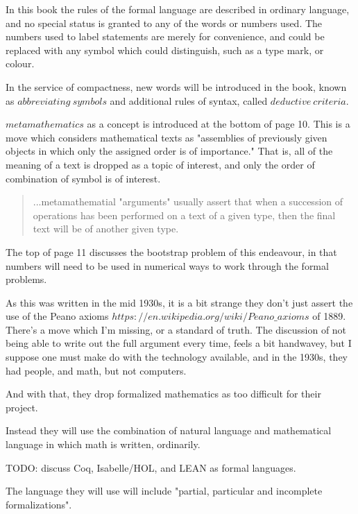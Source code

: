 \documentclass[]{scrartcl}
\begin{document}
In this book the rules of the formal language are described in ordinary language, and no special status is granted to any of the words or numbers used. The numbers used to label statements are merely for convenience, and could be replaced with any symbol which could distinguish, such as a type mark, or colour.

In the service of compactness, new words will be introduced in the book, known as $abbreviating\ symbols$ and additional rules of syntax, called $deductive\ criteria$. 

$metamathematics$ as a concept is introduced at the bottom of page 10. This is a move which considers mathematical texts as "assemblies of previously given objects in which only the assigned order is of importance." That is, all of the meaning of a text is dropped as a topic of interest, and only the order of combination of symbol is of interest. 

\begin{quote}
	...metamathematial "arguments" usually assert that when a succession of operations has been performed on a text of a given type, then the final text will be of another given type.
\end{quote}

The top of page 11 discusses the bootstrap problem of this endeavour, in that numbers will need to be used in numerical ways to work through the formal problems. 

As this was written in the mid 1930s, it is a bit strange they don't just assert the use of the Peano axioms \(https://en.wikipedia.org/wiki/Peano \_ axioms\) of 1889. There's a move which I'm missing, or a standard of truth. The discussion of not being able to write out the full argument every time, feels a bit handwavey, but I suppose one must make do with the technology available, and in the 1930s, they had people, and math, but not computers. 

And with that, they drop formalized mathematics as too difficult for their project.

Instead they will use the combination of natural language and mathematical language in which math is written, ordinarily.

TODO: discuss Coq, Isabelle/HOL, and LEAN as formal languages.

The language they will use will include "partial, particular and incomplete formalizations".
\end{document}

